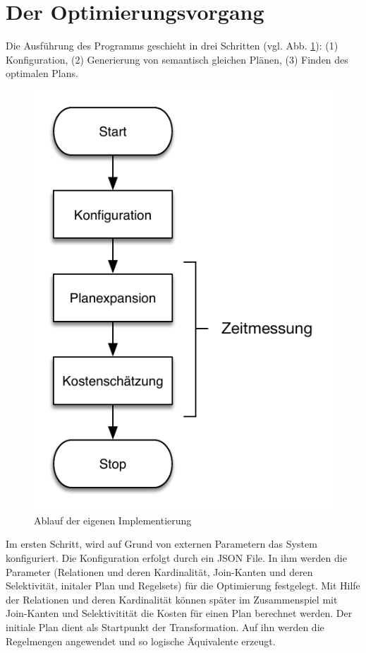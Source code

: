 \section{Der Optimierungsvorgang}


Die Ausführung des Programms geschieht in drei Schritten (vgl. Abb. \ref{Ablauf}): (1) Konfiguration, (2) Generierung von semantisch gleichen Plänen, (3) Finden des optimalen Plans.

\begin{figure}[h]
  \centering
  \includegraphics{04_Implementierung/00_media/Ablauf.pdf}
  \caption{Ablauf der eigenen Implementierung}
  \label{Ablauf}
\end{figure}


Im ersten Schritt, wird auf Grund von externen Parametern das System konfiguriert. Die Konfiguration erfolgt durch ein JSON File. In ihm werden die Parameter (Relationen und deren Kardinalität, Join-Kanten und deren Selektivität, initaler Plan und Regelsets) für die Optimierung festgelegt. Mit Hilfe der Relationen und deren Kardinalität können später im Zusammenspiel mit Join-Kanten und Selektivitität die Kosten für einen Plan berechnet werden. Der initiale Plan dient als Startpunkt der Transformation. Auf ihn werden die Regelmengen angewendet und so logische  Äquivalente erzeugt.

